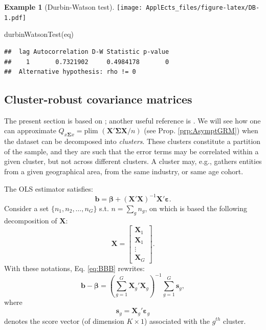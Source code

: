 \documentclass[
  12pt,
]{book}
\newenvironment{Shaded}{\begin{snugshade}}{\end{snugshade}}
\newcommand{\FunctionTok}[1]{\textcolor[rgb]{0.00,0.00,0.00}{#1}}
\newcommand{\NormalTok}[1]{#1}
\theoremstyle{definition}
\theoremstyle{definition}
\newtheorem{example}{Example}[chapter]
\theoremstyle{definition}
\theoremstyle{definition}
\theoremstyle{remark}
\begin{document}
\begin{example}[Durbin-Watson test]
\texttt{[image: ApplEcts\_files/figure-latex/DB-1.pdf]}

\begin{Shaded}
\begin{Highlighting}[]
\FunctionTok{durbinWatsonTest}\NormalTok{(eq)}
\end{Highlighting}
\end{Shaded}

\begin{verbatim}
##  lag Autocorrelation D-W Statistic p-value
##    1       0.7321902     0.4984178       0
##  Alternative hypothesis: rho != 0
\end{verbatim}

\end{example}

\hypertarget{Clusters}{%
\subsection{Cluster-robust covariance matrices}\label{Clusters}}

The present section is based on \citet{MACKINNON2022}; another useful reference is \citet{Cameron_Miller_2014}. We will see how one can approximate \(Q_{x\boldsymbol\Sigma x}=\mbox{plim }(\mathbf{X}'\boldsymbol\Sigma\mathbf{X}/n)\) (see Prop. \ref{prp:AsymptGRM}) when the dataset can be decomposed into \emph{clusters}. These clusters constitute a partition of the sample, and they are such that the error terms may be correlated within a given cluster, but not across different clusters. A cluster may, e.g., gathers entities from a given geographical area, from the same industry, or same age cohort.

The OLS estimator satisfies:
\begin{equation}
\mathbf{b} = \boldsymbol\beta + (\mathbf{X}'\mathbf{X})^{-1}\mathbf{X}'\boldsymbol\varepsilon.\label{eq:BBB}
\end{equation}
Consider a set \(\{n_1,n_2,\dots,n_G\}\) s.t. \(n=\sum_g n_g\), on which is based the following decomposition of \(\mathbf{X}\):
\[
\mathbf{X} = \left[
\begin{array}{c}
\mathbf{X}_1 \\
\mathbf{X}_1 \\
\vdots\\
\mathbf{X}_G
\end{array}
\right].
\]
With these notations, Eq. \eqref{eq:BBB} rewrites:
\begin{equation}
\mathbf{b} - \boldsymbol\beta = \left(\sum_{g=1}^G \mathbf{X}_g'\mathbf{X}_g\right)^{-1}\sum_{g=1}^G \mathbf{s}_g,\label{eq:cluster1}
\end{equation}
where
\begin{equation}
\mathbf{s}_g = \mathbf{X}_g'\boldsymbol\varepsilon_g \label{eq:definiS}
\end{equation}
denotes the score vector (of dimension \(K \times 1\)) associated with the \(g^{th}\) cluster.
\end{document}
